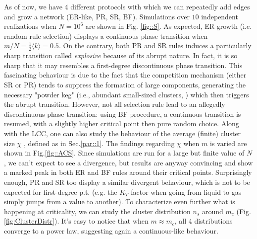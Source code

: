 As of now, we have 4 different protocols with which we can repeatedly add edges and grow a network (ER-like, PR, SR, BF). Simulations over $10$ independent realizations when $N = 10^6$ are shown in Fig. \ref{fig::S}. As expected, ER growth (i.e. random rule selection) displays a continuous phase transition when $m/N = \frac{1}{2}\langle k \rangle = 0.5$. On the contrary, both PR and SR rules induces a particularly sharp transition called \textit{explosive} because of its abrupt nature. In fact, it is so sharp that it may resembles a first-degree discontinuous phase transition. This fascinating behaviour is due to the fact that the competition mechanism (either SR or PR) tends to suppress the formation of large components, generating the necessary "powder keg" (i.e., abundant small-sized clusters,	\cite{bibid}) which then triggers the abrupt transition. However, not all selection rule lead to an allegedly discontinuous phase transition: using BF procedure, a continuous transition is resumed, with a slightly higher critical point then pure random choice. Along with the LCC, one can also study the behaviour of the average (finite) cluster size $\chi$ , defined as in Sec.\ref{par::1}. The findings regarding $\chi$ when $m$ is varied are shown in Fig.\ref{fig::ACS}. Since simulations are run for a large but finite value of $N$, we can't expect to see a divergence, but results are anyway convincing and show a marked peak in both ER and BF rules around their critical points. Surprisingly enough, PR and SR too display a similar divergent behaviour, which is not to be expected for first-degree p.t. (e.g. the $K_T$ factor when going from liquid to gas simply jumps from a value to another). To characterize even further what is happening at criticality, we can study the cluster distribution $n_s$ around $m_c$ (Fig. \ref{fig:ClusterDistr}). It's easy to notice that when $m \approx m_c$, all 4 distributions converge to a power law, suggesting again a continuous-like behaviour.



